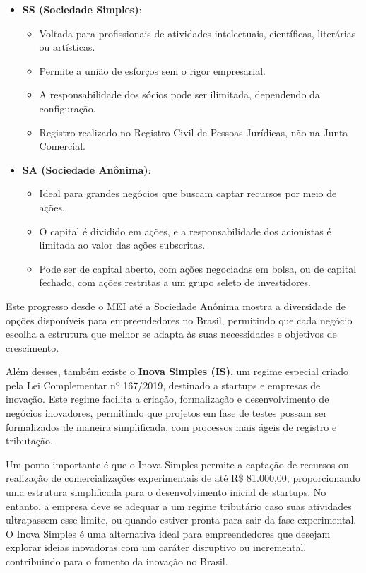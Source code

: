 \begin{itemize}
    \item \textbf{SS (Sociedade Simples)}:
          \begin{itemize}
              \item Voltada para profissionais de atividades intelectuais, científicas, literárias ou artísticas.
              \item Permite a união de esforços sem o rigor empresarial.
              \item A responsabilidade dos sócios pode ser ilimitada, dependendo da configuração.
              \item Registro realizado no Registro Civil de Pessoas Jurídicas, não na Junta Comercial.
          \end{itemize}

    \item \textbf{SA (Sociedade Anônima)}:
          \begin{itemize}
              \item Ideal para grandes negócios que buscam captar recursos por meio de ações.
              \item O capital é dividido em ações, e a responsabilidade dos acionistas é limitada ao valor das ações subscritas.
              \item Pode ser de capital aberto, com ações negociadas em bolsa, ou de capital fechado, com ações restritas a um grupo seleto de investidores.
          \end{itemize}

\end{itemize}
\vspace{0.4cm}
Este progresso desde o MEI até a Sociedade Anônima mostra a diversidade de opções disponíveis para empreendedores no Brasil, permitindo que cada negócio escolha a estrutura que melhor se adapta às suas necessidades e objetivos de crescimento.

\vspace{0.4cm}
Além desses, também existe o \textbf{Inova Simples (IS)}, um regime especial criado pela Lei Complementar nº 167/2019, destinado a startups e empresas de inovação. Este regime facilita a criação, formalização e desenvolvimento de negócios inovadores, permitindo que projetos em fase de testes possam ser formalizados de maneira simplificada, com processos mais ágeis de registro e tributação. 

Um ponto importante é que o Inova Simples permite a captação de recursos ou realização de comercializações experimentais de até R\$ 81.000,00, proporcionando uma estrutura simplificada para o desenvolvimento inicial de startups. No entanto, a empresa deve se adequar a um regime tributário caso suas atividades ultrapassem esse limite, ou quando estiver pronta para sair da fase experimental. O Inova Simples é uma alternativa ideal para empreendedores que desejam explorar ideias inovadoras com um caráter disruptivo ou incremental, contribuindo para o fomento da inovação no Brasil.
